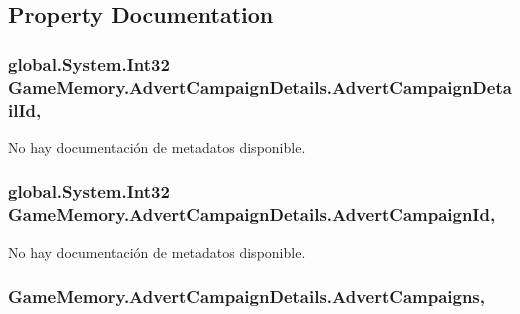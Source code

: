 \subsection{Property Documentation}
\hypertarget{class_game_memory_1_1_advert_campaign_details_a8c0831e7c4ad9024c34271fea79ce567}{
\subsubsection[{Advert\-Campaign\-Detail\-Id}]{\setlength{\rightskip}{0pt plus 5cm}global.\-System.\-Int32 Game\-Memory.\-Advert\-Campaign\-Details.\-Advert\-Campaign\-Detail\-Id\hspace{0.3cm}{\ttfamily [get]}, {\ttfamily [set]}}}\label{class_game_memory_1_1_advert_campaign_details_a8c0831e7c4ad9024c34271fea79ce567}


No hay documentación de metadatos disponible. 

\hypertarget{class_game_memory_1_1_advert_campaign_details_afa3d0399d1018143dabdf96501e5df3d}{
\subsubsection[{Advert\-Campaign\-Id}]{\setlength{\rightskip}{0pt plus 5cm}global.\-System.\-Int32 Game\-Memory.\-Advert\-Campaign\-Details.\-Advert\-Campaign\-Id\hspace{0.3cm}{\ttfamily [get]}, {\ttfamily [set]}}}\label{class_game_memory_1_1_advert_campaign_details_afa3d0399d1018143dabdf96501e5df3d}


No hay documentación de metadatos disponible. 

\hypertarget{class_game_memory_1_1_advert_campaign_details_afbf36c0e9f7113d2b946475ab0ff95df}{
\subsubsection[{Advert\-Campaigns}]{ Game\-Memory.\-Advert\-Campaign\-Details.\-Advert\-Campaigns\hspace{0.3cm}{\ttfamily [get]}, {\ttfamily [set]}}}\label{class_game_memory_1_1_advert_campaign_details_afbf36c0e9f7113d2b946475ab0ff95df}


